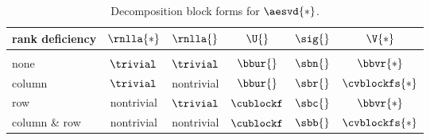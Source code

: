 \begin{table}[t]
	\begin{center}
		\begin{tabular}{lccccc}
		  rank deficiency & $\rnlla{*}$ & $\rnlla{}$ & $\U{}$ & $\sig{}$ & $\V{*}$\\\hline
		  & \\
		  none & $\trivial$ & $\trivial$ & $\bbur{}$ & $\sbn{}$ & $\bbvr{*}$ \\[5pt]
		  column & $\trivial$ & nontrivial & $\bbur{}$ & $\sbr{}$ & $\cvblockfs{*}$ \\[5pt]
		  row  & nontrivial & $\trivial$ & $\cublockf$ & $\sbc{}$ & $\bbvr{*}$ \\[5pt]
		  column \& row & nontrivial & nontrivial & $\cublockf$ & $\sbb{}$ & $\cvblockfs{*}$ \\[5pt]
		\end{tabular}
	\end{center}
	\label{tab:svd blocks}
	\caption[Decomposition block forms]{Decomposition block forms for $\aesvd{*}$.}
\end{table}%

\endinput  %

